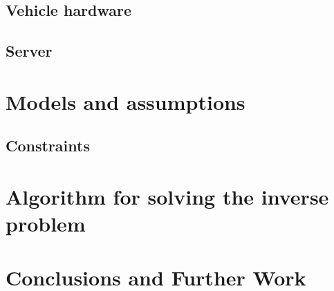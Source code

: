 \documentclass[english]{article}\usepackage[]{graphicx}\usepackage[]{color}
\begin{document}
\subsection{Vehicle hardware}
\subsection{Server}
\begin{comment}
Description of testbed, hardware, software, logic
Sid's flowchart
\end{comment}

\section{Models and assumptions}
\subsection{Constraints}
\begin{comment}
Description of constraints for our problem
limited bandwidth, data storage
Also assumptions about simple piecewise environments
\end{comment}

\section{Algorithm for solving the inverse problem}
\begin{comment}
\end{comment}
\section{Conclusions and Further Work}
\end{document}
